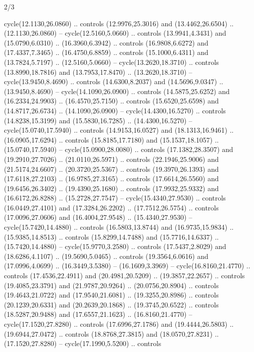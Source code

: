 \begin{flagdescription}{2/3}
\begin{scope}[yshift=\flagwidth,scale=\flagwidth/1241.93737]
\begin{scope}[y=-1mm, x=1mm,draw=gold,fill=blue,line join=miter,miter limit=4,line width=1.8\lw]
\begin{scope}[y=1mm, x=1mm, yscale=-1,shift={(573.68mm+\str,145.75)}]
\begin{scope}[scale=1.35,shift={(-9,-3)}]
\begin{scope}[scale=0.55]
\begin{scope}[scale=1.333]
    cycle(12.1130,26.0860) .. controls (12.9976,25.3016) and (13.4462,26.6504) ..
    (12.1130,26.0860) -- cycle(12.5160,5.0660) .. controls (13.9941,4.3431) and
    (15.0790,6.0310) .. (16.3960,6.3942) .. controls (16.9808,6.6272) and
    (17.4337,7.3465) .. (16.4750,6.8859) .. controls (15.1000,6.4311) and
    (13.7824,5.7197) .. (12.5160,5.0660) -- cycle(13.2620,18.3710) .. controls
    (13.8990,18.7816) and (13.7953,17.8470) .. (13.2620,18.3710) --
    cycle(13.9450,8.4690) .. controls (14.6300,8.2037) and (14.5696,9.0347) ..
    (13.9450,8.4690) -- cycle(14.1090,26.0900) .. controls (14.5875,25.6252) and
    (16.2334,24.9903) .. (16.4570,25.7150) .. controls (15.6520,25.6598) and
    (14.8717,26.6734) .. (14.1090,26.0900) -- cycle(14.4300,16.5270) .. controls
    (14.8238,15.3199) and (15.5830,16.7285) .. (14.4300,16.5270) --
    cycle(15.0740,17.5940) .. controls (14.9153,16.0527) and (18.1313,16.9461) ..
    (16.0905,17.6294) .. controls (15.8185,17.7180) and (15.1537,18.1057) ..
    (15.0740,17.5940) -- cycle(15.0900,28.0080) .. controls (17.1382,28.3507) and
    (19.2910,27.7026) .. (21.0110,26.5971) .. controls (22.1946,25.9006) and
    (21.5174,24.6607) .. (20.3720,25.5367) .. controls (19.3970,26.1393) and
    (17.6118,27.2103) .. (16.9785,27.3165) .. controls (17.6614,26.5560) and
    (19.6456,26.3402) .. (19.4390,25.1680) .. controls (17.9932,25.9332) and
    (16.6172,26.8288) .. (15.2728,27.7547) -- cycle(15.4340,27.9530) .. controls
    (16.0449,27.4101) and (17.3284,26.2202) .. (17.7512,26.5754) .. controls
    (17.0096,27.0606) and (16.4004,27.9548) .. (15.4340,27.9530) --
    cycle(15.7420,14.4880) .. controls (16.5803,13.8744) and (16.9735,15.9834) ..
    (15.9385,14.8513) .. controls (15.8299,14.7488) and (15.7716,14.6337) ..
    (15.7420,14.4880) -- cycle(15.9770,3.2580) .. controls (17.5437,2.8029) and
    (18.6286,4.1107) .. (19.5690,5.0465) .. controls (19.3564,6.0616) and
    (17.0996,4.0699) .. (16.3449,3.5380) -- (16.1609,3.3969) --
    cycle(16.8160,21.4770) .. controls (17.4536,22.4911) and (20.4981,20.5209) ..
    (19.3857,22.2657) .. controls (19.4085,23.3791) and (21.9787,20.9264) ..
    (20.0756,20.8904) .. controls (19.4643,21.0722) and (17.9540,21.6081) ..
    (19.3255,20.8986) .. controls (20.1239,20.6331) and (20.2639,20.1868) ..
    (19.3745,20.6522) .. controls (18.5287,20.9488) and (17.6557,21.1623) ..
    (16.8160,21.4770) -- cycle(17.1520,27.8280) .. controls (17.6996,27.1786) and
    (19.4444,26.5803) .. (19.6944,27.0472) .. controls (18.8768,27.3815) and
    (18.0570,27.8231) .. (17.1520,27.8280) -- cycle(17.1990,5.5200) .. controls

\end{scope}
\end{scope}
\end{scope}
\end{scope}
\end{scope}
\end{scope}
\end{flagdescription}
